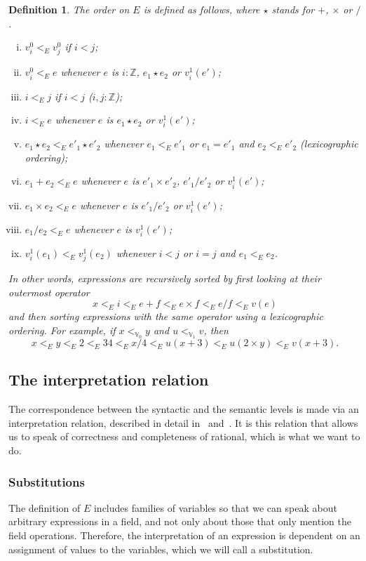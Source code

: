 \documentclass{article}
\newtheorem{definition}{Definition}[section]
\newcommand{\Z}{{\mathbb Z}}
\newcommand{\V}{{\mathbb V}}
\newcommand{\tacticname}[1]{\textsf{#1}}
\newcommand{\rational}{\tacticname{rational}}
\begin{document}
\begin{definition}\label{defn:exprorder}
The \emph{order} on $E$ is defined as follows, where $\star$ stands for $+$,
$\times$ or $/$.
\begin{enumerate}[(i)]
\item $v^0_i<_E v^0_j$ if $i<j$;
\item $v^0_i<_E e$ whenever $e$ is $i:\Z$, $e_1\star e_2$ or $v^1_i(e')$;
\item $i<_E j$ if $i<j$ ($i,j:\Z$);
\item $i<_E e$ whenever $e$ is $e_1\star e_2$ or $v^1_i(e')$;
\item $e_1\star e_2<_E e'_1\star e'_2$ whenever $e_1<_E e'_1$ or $e_1=e'_1$ and
$e_2<_E e'_2$ (lexicographic ordering);
\item $e_1+e_2<_E e$ whenever $e$ is $e'_1\times e'_2$, $e'_1/e'_2$
or $v^1_i(e')$;
\item $e_1\times e_2<_E e$ whenever $e$ is $e'_1/e'_2$ or $v^1_i(e')$;
\item $e_1/e_2<_E e$ whenever $e$ is $v^1_i(e')$;
\item $v^1_i(e_1)<_E v^1_j(e_2)$ whenever $i<j$ or $i=j$ and $e_1<_E e_2$.
\end{enumerate}
In other words, expressions are recursively sorted by first looking at
their outermost operator $$x <_E i <_E e+f <_E e\times f <_E e/f <_E
v(e)$$ and then sorting expressions with the same operator using a
lexicographic ordering.
For example, if $x<_{\V_0}y$ and $u<_{\V_1}v$, then
$$x<_E y<_E 2<_E 34<_E x/4<_E u(x+3)<_E u(2\times y)<_E v(x+3).$$
\end{definition}

\subsection{The interpretation relation}\label{interpretation}

The correspondence between the syntactic and the semantic levels is
made via an interpretation relation, described in detail
in~\cite{geu:wie:zwa:00} and~\cite{lcf:wie:04}.
It is this relation that allows us to speak of correctness and completeness
of {\rational}, which is what we want to do.

\subsubsection*{Substitutions}

The definition of $E$ includes families of variables so that we can
speak about arbitrary expressions in a field, and not only about those
that only mention the field operations.
Therefore, the interpretation of an expression is dependent on an assignment
of values to the variables, which we will call a substitution.
\end{document}
